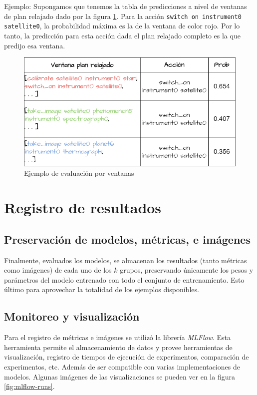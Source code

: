 Ejemplo: Supongamos que tenemos la tabla de predicciones a nivel de ventanas de
plan relajado dado por la figura \ref{fig:window_example_evaluation}. Para la acción
\verb|switch on instrument0 satellite0|, la probabilidad máxima es la de la
ventana de color rojo. Por lo tanto, la predicción para esta acción dada el plan
relajado completo es la que predijo esa ventana.

\begin{figure}[t!]
    \centering
    \includegraphics[width=\linewidth]{figures/aggregation_example.png}
    \caption{Ejemplo de evaluación por ventanas}
    \label{fig:window_example_evaluation}
\end{figure}

\section{Registro de resultados}

\subsection{Preservación de modelos, métricas, e imágenes}

Finalmente, evaluados los modelos, se almacenan los resultados (tanto métricas
como imágenes) de cada uno de los $k$ grupos, preservando únicamente los pesos y
parámetros del modelo entrenado con todo el conjunto de entrenamiento. Esto
último para aprovechar la totalidad de los ejemplos disponibles.

\subsection{Monitoreo y visualización}

Para el registro de métricas e imágenes se utilizó la librería \emph{MLFlow}.
 Esta herramienta permite el almacenamiento de datos y provee herramientas de
 visualización, registro de tiempos de ejecución de experimentos, comparación de
 experimentos, etc. Además de ser compatible con varias implementaciones de
 modelos. Algunas imágenes de las visualizaciones se pueden ver en la figura
 \ref{fig:mlflow-runs}.


